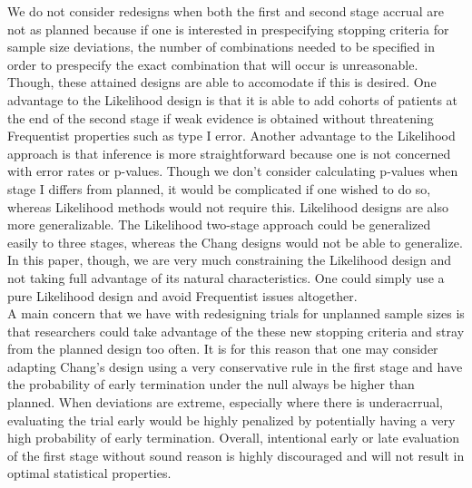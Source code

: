 \documentclass[12pt]{report}\usepackage[]{graphicx}\usepackage[]{color}
\newlength{\li}\setlength{\li}{14.48pt}
\newlength{\di}\setlength{\di}{-3.5mm}
\begin{document}
\indent We do not consider redesigns when both the first and second stage accrual are not as planned because if one is interested in prespecifying stopping criteria for sample size deviations, the number of combinations needed to be specified in order to prespecify the exact combination that will occur is unreasonable. Though, these attained designs are able to accomodate if this is desired. One advantage to the Likelihood design is that it is able to add cohorts of patients at the end of the second stage if weak evidence is obtained without threatening Frequentist properties such as type I error. Another advantage to the Likelihood approach is that inference is more straightforward because one is not concerned with error rates or p-values. Though we don't consider calculating p-values when stage I differs from planned, it would be complicated if one wished to do so, whereas Likelihood methods would not require this. Likelihood designs are also more generalizable. The Likelihood two-stage approach could be generalized easily to three stages, whereas the Chang designs would not be able to generalize. In this paper, though, we are very much constraining the Likelihood design and not taking full advantage of its natural characteristics. One could simply use a pure Likelihood design and avoid Frequentist issues altogether. \\
\indent A main concern that we have with redesigning trials for unplanned sample sizes is that researchers could take advantage of the these new stopping criteria and stray from the planned design too often. It is for this reason that one may consider adapting Chang's design using a very conservative rule in the first stage and have the probability of early termination under the null always be higher than planned. When deviations are extreme, especially where there is underacrrual, evaluating the trial early would be highly penalized by potentially having a very high probability of early termination. Overall, intentional early or late evaluation of the first stage without sound reason is highly discouraged and will not result in optimal statistical properties. 








%

		
\end{document}
